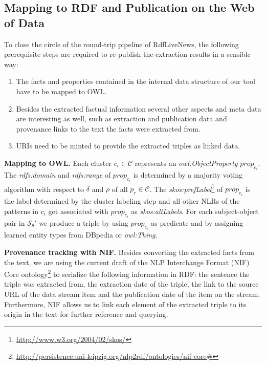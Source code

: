 \documentclass[a4paper]{llncs}
\newcommand{\NAME}{RdfLiveNews}
\begin{document}
\subsection{Mapping to RDF and Publication on the Web of Data}
\label{subsec:rdf_publication}
To close the circle of the round-trip pipeline of \NAME, the following prerequisite steps are required to re-publish the extraction results in a sensible way:
\begin{enumerate}
 \item The facts and properties contained in the internal data structure of our tool have to be mapped to OWL.
 \item Besides the extracted factual information several other aspects and meta data are interesting as well, such as extraction and publication data and provenance links to the text the facts were extracted from.
 \item URIs need to be minted to provide the extracted triples as linked data. 
\end{enumerate}

\textbf{Mapping to OWL.} Each cluster $c_i \in \mathcal{C}$ represents an \emph{owl:ObjectProperty} $prop_{c_i}$.
The \emph{rdfs:domain} and \emph{rdfs:range} of $prop_{c_i}$ is determined by a majority voting algorithm with respect to $\delta$ and $\rho$ of all $p_r \in \mathcal{C}$.
The \emph{skos:prefLabel}\footnote{\url{http://www.w3.org/2004/02/skos/}} of $prop_{c_i}$ is the label determined by the cluster labeling step and all other NLRs of the patterns in $c_i$ get associated with $prop_{c_i}$ as \emph{skos:altLabels}.
For each subject-object pair in $\mathcal{S_\theta}'$ we produce a triple by using $prop_{c_i}$ as predicate and by assigning learned entity types from DBpedia or \emph{owl:Thing}. 

\textbf{Provenance tracking with NIF.} Besides converting the extracted facts from the text, we are using the current draft of the NLP Interchange Format (NIF) Core ontology\footnote{\url{http://persistence.uni-leipzig.org/nlp2rdf/ontologies/nif-core#}} to serialize the following information in RDF: the sentence the triple was extracted from, the extraction date of the triple, the link to the source URL of the data stream item and the publication date of the item on the stream.
Furthermore, NIF allows us to link each element of the extracted triple to its origin in the text for further reference and querying. 
\end{document}
